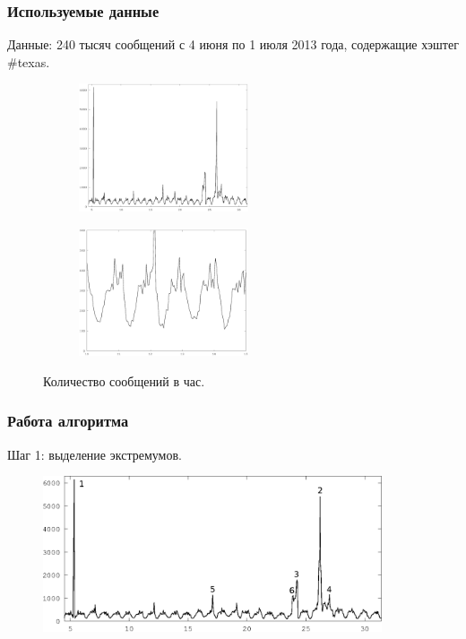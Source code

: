 \documentclass[10pt,pdf,hyperref={unicode}]{beamer}
\begin{document}
\begin{frame}
  \frametitle{Используемые данные}
  Данные: 240 тысяч сообщений с 4 июня по 1 июля 2013 года, содержащие хэштег \#texas.
    \begin{figure}[H]
  \centering
  \begin{subfigure}[b]{0.45 \textwidth}
	  \centering
	  \includegraphics[width=5.0cm]{all-freq.eps}
  \end{subfigure}
  \begin{subfigure}[b]{0.45 \textwidth}
	  \centering
	  \includegraphics[width=5.0cm]{all-freq-scaled.eps}
  \end{subfigure}  
  \caption{Количество сообщений в час.}
	\end{figure}
\end{frame}

\begin{frame}
\frametitle{Работа алгоритма}
 Шаг 1: выделение экстремумов.
 \begin{figure}[H]
  \centering
  \includegraphics[width=10.0cm]{all-freq-labeled-1.eps}
  \label{fig:all-freq-labeled}
 \end{figure}
\end{frame}
\end{document}
